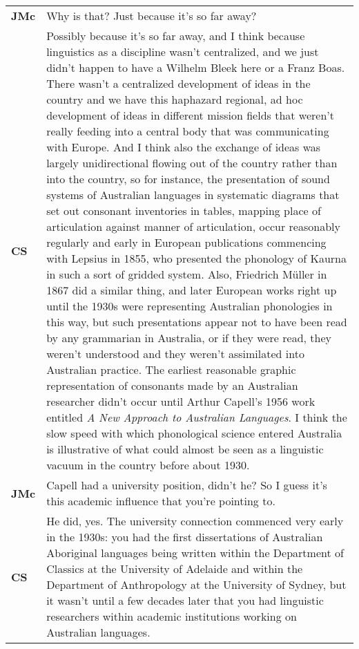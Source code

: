 \documentclass[12pt]{article}
\begin{document}
\begin{flushleft}
\begin{supertabular}{m{0.24415985in}m{5.89766in}}
\textbf{JMc}\newline
 &
Why is that? Just because it’s so far away?\\
\textbf{CS}\newline
 &
Possibly because it’s so far away, and I think because linguistics as a discipline wasn’t centralized, and we just didn’t happen to have a Wilhelm Bleek here or a Franz Boas. There wasn’t a centralized development of ideas in the country and we have this haphazard regional, ad hoc development of ideas in different mission fields that weren’t really feeding into a central body that was communicating with Europe. And I think also the exchange of ideas was largely unidirectional flowing out of the country rather than into the country, so for instance, the presentation of sound systems of Australian languages in systematic diagrams that set out consonant inventories in tables, mapping place of articulation against manner of articulation, occur reasonably regularly and early in European publications commencing with Lepsius in 1855, who presented the phonology of Kaurna in such a sort of gridded system. Also, Friedrich Müller in 1867 did a similar thing, and later European works right up until the 1930s were representing Australian phonologies in this way, but such presentations appear not to have been read by any grammarian in Australia, or if they were read, they weren’t understood and they weren’t assimilated into Australian practice. The earliest reasonable graphic representation of consonants made by an Australian researcher didn’t occur until Arthur Capell’s 1956 work entitled \textit{A New Approach to Australian Languages}. I think the slow speed with which phonological science entered Australia is illustrative of what could almost be seen as a linguistic vacuum in the country before about 1930.\\
\textbf{JMc}\newline
 &
Capell had a university position, didn’t he? So I guess it’s this academic influence that you’re pointing to.\\
\textbf{CS}\newline
 &
He did, yes. The university connection commenced very early in the 1930s: you had the first dissertations of Australian Aboriginal languages being written within the Department of Classics at the University of Adelaide and within the Department of Anthropology at the University of Sydney, but it wasn’t until a few decades later that you had linguistic researchers within academic institutions working on Australian languages.\\

\end{supertabular}
\end{flushleft}
\end{document}
